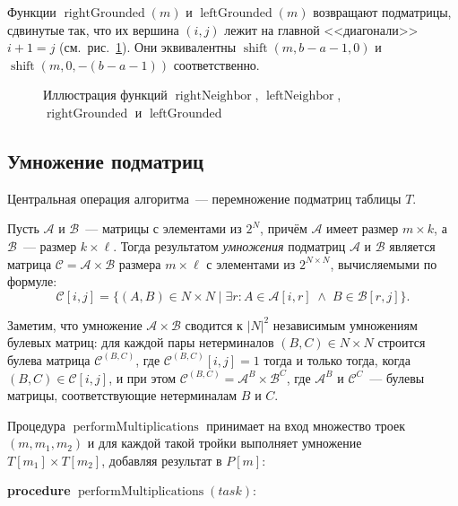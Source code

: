 Функции $\operatorname{rightGrounded}(m)$ и $\operatorname{leftGrounded}(m)$ возвращают подматрицы, сдвинутые так, что их вершина $(i, j)$ лежит на главной <<диагонали>> $i + 1 = j$ (см.~рис.~\ref{fig:ValiantOuter}).
Они эквивалентны $\operatorname{shift}(m, b - a - 1, 0)$ и $\operatorname{shift}(m, 0, -(b - a - 1))$ соответственно.

\begin{figure}[h]
  \centering
  \resizebox{0.7\linewidth}{!}{}
  \caption{Иллюстрация функций $\operatorname{rightNeighbor}$, $\operatorname{leftNeighbor}$, $\operatorname{rightGrounded}$ и $\operatorname{leftGrounded}$}
  \label{fig:ValiantOuter}
\end{figure}

\subsection{Умножение подматриц}

Центральная операция алгоритма~--- перемножение подматриц таблицы $T$.

\begin{definition}
  \label{def:ValiantMultiplication}
  Пусть $\mathcal{A}$ и $\mathcal{B}$~--- матрицы с элементами из $2^N$, причём $\mathcal{A}$ имеет размер $m \times k$, а $\mathcal{B}$~--- размер $k \times \ell$.
  Тогда результатом \emph{умножения} подматриц $\mathcal{A}$ и $\mathcal{B}$ является матрица $\mathcal{C} = \mathcal{A} \times \mathcal{B}$ размера $m \times \ell$ с элементами из $2^{N \times N}$, вычисляемыми по формуле:
  \[
    \mathcal{C}[i,j] = \{(A,B) \in N \times N \mid \exists r : A \in \mathcal{A}[i,r] \;\land\; B \in \mathcal{B}[r,j]\}.
  \]
\end{definition}

Заметим, что умножение $\mathcal{A} \times \mathcal{B}$ сводится к $|N|^2$ независимым умножениям булевых матриц: для каждой пары нетерминалов $(B, C) \in N \times N$ строится булева матрица $\mathcal{C}^{(B,C)}$, где $\mathcal{C}^{(B,C)}[i,j] = 1$ тогда и только тогда, когда $(B, C) \in \mathcal{C}[i,j]$, и при этом $\mathcal{C}^{(B,C)} = \mathcal{A}^{B} \times \mathcal{B}^{C}$, где $\mathcal{A}^{B}$ и $\mathcal{C}^{C}$~--- булевы матрицы, соответствующие нетерминалам $B$ и $C$.

Процедура $\operatorname{performMultiplications}$ принимает на вход множество троек $(m, m_1, m_2)$ и для каждой такой тройки выполняет умножение $T[m_1] \times T[m_2]$, добавляя результат в $P[m]$:
\begin{algorithm}[H]
  \caption{Процедура перемножения подматриц}
  \label{alg:ValiantPerformMultiplications}
  \textbf{procedure} $\operatorname{performMultiplications}(task)$:\;
\end{algorithm}

